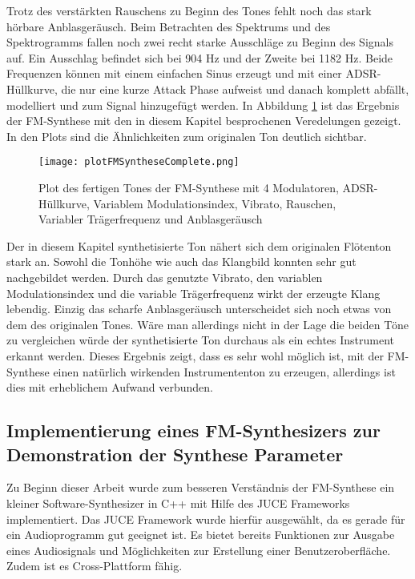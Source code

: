 Trotz des verstärkten Rauschens zu Beginn des Tones fehlt noch das stark hörbare Anblasgeräusch. Beim Betrachten des Spektrums und des Spektrogramms fallen noch zwei recht starke Ausschläge zu Beginn des Signals auf. Ein Ausschlag befindet sich bei 904 Hz und der Zweite bei 1182 Hz. Beide Frequenzen können mit einem einfachen Sinus erzeugt und mit einer ADSR-Hüllkurve, die nur eine kurze Attack Phase aufweist und danach komplett abfällt, modelliert und zum Signal hinzugefügt werden. In Abbildung \ref{fig:plotFMSyntheseComplete} ist das Ergebnis der FM-Synthese mit den in diesem Kapitel besprochenen Veredelungen gezeigt. In den Plots sind die Ähnlichkeiten zum originalen Ton deutlich sichtbar.

\begin{figure} [h!t!b!]
\centering
  \texttt{[image: plotFMSyntheseComplete.png]}
\caption{Plot des fertigen Tones der FM-Synthese mit 4 Modulatoren, ADSR-Hüllkurve, Variablem Modulationsindex, Vibrato, Rauschen, Variabler Trägerfrequenz und Anblasgeräusch}
\label{fig:plotFMSyntheseComplete}
\end{figure}

Der in diesem Kapitel synthetisierte Ton nähert sich dem originalen Flötenton stark an. Sowohl die Tonhöhe wie auch das Klangbild konnten sehr gut nachgebildet werden. Durch das genutzte Vibrato, den variablen Modulationsindex und die variable Trägerfrequenz wirkt der erzeugte Klang lebendig. Einzig das scharfe Anblasgeräusch unterscheidet sich noch etwas von dem des originalen Tones. Wäre man allerdings nicht in der Lage die beiden Töne zu vergleichen würde der synthetisierte Ton durchaus als ein echtes Instrument erkannt werden. Dieses Ergebnis zeigt, dass es sehr wohl möglich ist, mit der FM-Synthese einen natürlich wirkenden Instrumententon zu erzeugen, allerdings ist dies mit erheblichem Aufwand verbunden.


\FloatBarrier
\subsection{Implementierung eines FM-Synthesizers zur Demonstration der Synthese Parameter}

Zu Beginn dieser Arbeit wurde zum besseren Verständnis der FM-Synthese ein kleiner Software-Synthesizer in C++ mit Hilfe des JUCE Frameworks implementiert. Das JUCE Framework wurde hierfür ausgewählt, da es gerade für ein Audioprogramm gut geeignet ist. Es bietet bereits Funktionen zur Ausgabe eines Audiosignals und Möglichkeiten zur Erstellung einer Benutzeroberfläche. Zudem ist es Cross-Plattform fähig.


